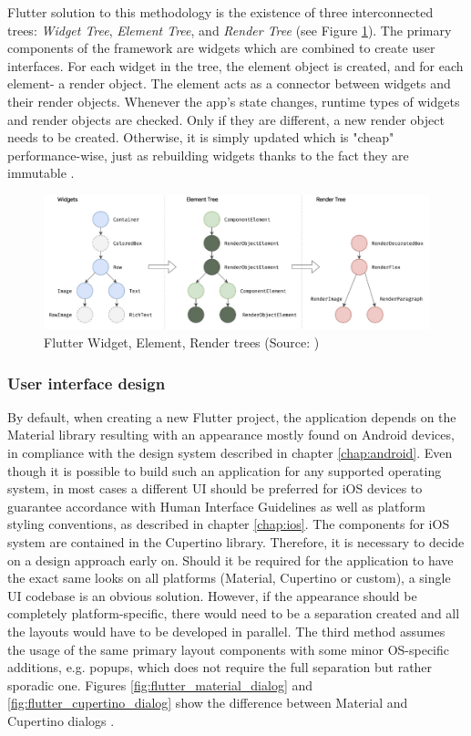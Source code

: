 Flutter solution to this methodology is the existence of three interconnected trees: \emph{Widget Tree}, \emph{Element Tree}, and \emph{Render Tree} (see Figure \ref{fig:flutter_trees}). The primary components of the framework are widgets which are combined to create user interfaces. For each widget in the tree, the element object is created, and for each element- a render object. The element acts as a connector between widgets and their render objects. Whenever the app's state changes, runtime types of widgets and render objects are checked. Only if they are different, a new render object needs to be created. Otherwise, it is simply updated which is "cheap" performance-wise, just as rebuilding widgets thanks to the fact they are immutable \cite{flutter_docs_architecture}.

\begin{figure}[h]
    \centering
    \includegraphics[width=\textwidth]{img/flutter_trees}
    \caption{Flutter Widget, Element, Render trees (Source: \cite{flutter_docs_architecture})}
    \label{fig:flutter_trees}
\end{figure}

\subsubsection*{User interface design}

By default, when creating a new Flutter project, the application depends on the Material library resulting with an appearance mostly found on Android devices, in compliance with the design system described in chapter \ref{chap:android}. Even though it is possible to build such an application for any supported operating system, in most cases a different UI should be preferred for iOS devices to guarantee accordance with Human Interface Guidelines as well as platform styling conventions, as described in chapter \ref{chap:ios}. The components for iOS system are contained in the Cupertino library. Therefore, it is necessary to decide on a design approach early on. Should it be required for the application to have the exact same looks on all platforms (Material, Cupertino or custom), a single UI codebase is an obvious solution. However, if the appearance should be completely platform-specific, there would need to be a separation created and all the layouts would have to be developed in parallel. The third method assumes the usage of the same primary layout components with some minor OS-specific additions, e.g. popups, which does not require the full separation but rather sporadic one. Figures \ref{fig:flutter_material_dialog} and \ref{fig:flutter_cupertino_dialog} show the difference between Material and Cupertino dialogs \cite{flutter_docs_architecture,kosinski_flutter_vs_rn_vs_qt}.

